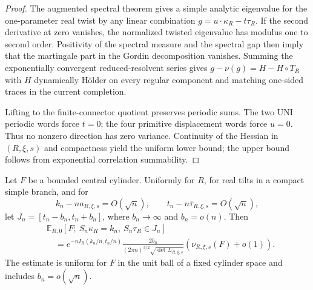 \begin{proof}
The augmented spectral theorem gives a simple analytic eigenvalue for the
one-parameter real twist by any linear combination
\(g=u\cdot\kappa_R-t\tau_R\).  If the second derivative at zero vanishes,
the normalized twisted eigenvalue has modulus one to second order.  Positivity
of the spectral measure and the spectral gap then imply that the martingale
part in the Gordin decomposition vanishes.  Summing the exponentially
convergent reduced-resolvent series gives
\(g-\nu(g)=H-H\circ T_R\) with \(H\) dynamically H\"older on every regular
component and matching one-sided traces in the current completion.

Lifting to the finite-connector quotient preserves periodic sums.  The two UNI
periodic words force \(t=0\); the four primitive displacement words force
\(u=0\).  Thus no nonzero direction has zero variance.  Continuity of the
Hessian in \((R,\xi,s)\) and compactness yield the uniform lower bound; the
upper bound follows from exponential correlation summability.
\end{proof}

\begin{theorem}
\label{thm:r3-a2-llt}
Let \(F\) be a bounded central cylinder.  Uniformly for \(R\), for real tilts
in a compact simple branch, and for
\[
 k_n-na_{R,\xi,s}=O(\sqrt n),
 \qquad
 t_n-n\bar\tau_{R,\xi,s}=O(\sqrt n),
\]
let \(J_n=[t_n-b_n,t_n+b_n]\), where
\(b_n\to\infty\) and \(b_n=o(n)\).  Then
\[
 \begin{aligned}
 &\mathbb E_{R,0}
 \left[F;\ S_n\kappa_R=k_n,\ S_n\tau_R\in J_n\right]\\
 &\quad=e^{-nI_R(k_n/n,t_n/n)}
 \frac{2b_n}{(2\pi n)^{3/2}\sqrt{\det\Sigma_{R,\xi,s}}}
 \left(\nu_{R,\xi,s}(F)+o(1)\right).
 \end{aligned}
\]
The estimate is uniform for \(F\) in the unit ball of a fixed cylinder space
and includes \(b_n=o(\sqrt n)\).
\end{theorem}

